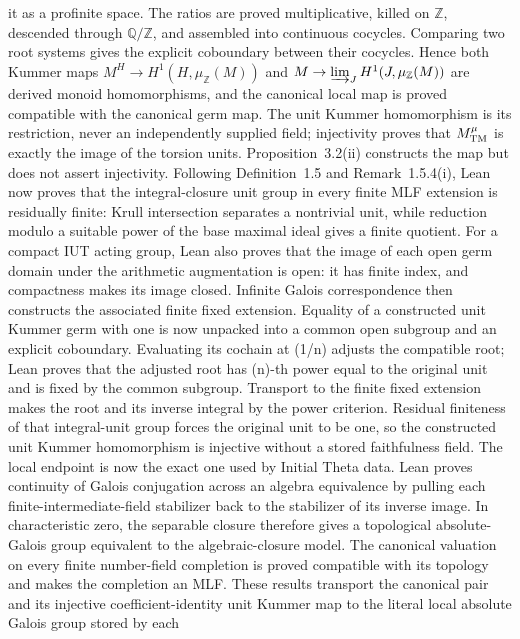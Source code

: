 \begin{definition}
  it as a profinite space.  The ratios are proved multiplicative, killed
  on \(\mathbb Z\), descended through \(\mathbb Q/\mathbb Z\), and assembled
  into continuous cocycles.  Comparing two root systems gives the explicit
  coboundary between their cocycles.  Hence both Kummer maps
  \(M^H\to H^1(H,\mu_{\mathbb Z}(M))\) and
  \(M\to\varinjlim_JH^1(J,\mu_{\mathbb Z}(M))\) are derived monoid
  homomorphisms, and the canonical local map is proved compatible with the
  canonical germ map.
  The unit Kummer homomorphism is its restriction, never an independently
  supplied field; injectivity proves that \(M_{\rm TM}^{\mu}\) is exactly the
  image of the torsion units.  Proposition~3.2(ii) constructs the map but does
  not assert injectivity.  Following Definition~1.5 and Remark~1.5.4(i), Lean
  now proves that the integral-closure unit group in every finite MLF extension
  is residually finite: Krull intersection separates a nontrivial unit, while
  reduction modulo a suitable power of the base maximal ideal gives a finite
  quotient.  For a compact IUT acting group, Lean also proves that the image of
  each open germ domain under the arithmetic augmentation is open: it has
  finite index, and compactness makes its image closed.  Infinite Galois
  correspondence then constructs the associated finite fixed extension.
  Equality of a constructed unit Kummer germ with one is now unpacked into a
  common open subgroup and an explicit coboundary.  Evaluating its cochain at
  (1/n) adjusts the compatible root; Lean proves that the adjusted root has
  (n)-th power equal to the original unit and is fixed by the common
  subgroup.  Transport to the finite fixed extension makes the root and its
  inverse integral by the power criterion.  Residual finiteness of that
  integral-unit group forces the original unit to be one, so the constructed
  unit Kummer homomorphism is injective without a stored faithfulness field.
  The local endpoint is now the exact one used by Initial Theta data.  Lean
  proves continuity of Galois conjugation across an algebra equivalence by
  pulling each finite-intermediate-field stabilizer back to the stabilizer of
  its inverse image.  In characteristic zero, the separable closure therefore
  gives a topological absolute-Galois group equivalent to the algebraic-closure
  model.  The canonical valuation on every finite number-field completion is
  proved compatible with its topology and makes the completion an MLF.  These
  results transport the canonical pair and its injective coefficient-identity
  unit Kummer map to the literal local absolute Galois group stored by each

\end{definition}
